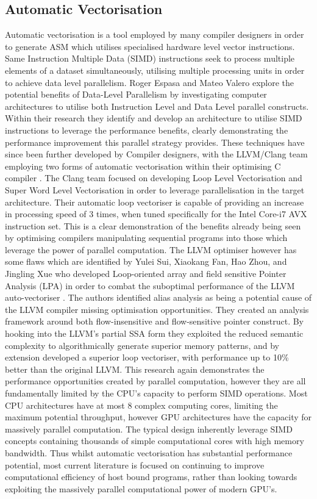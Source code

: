 \subsection{Automatic Vectorisation}
Automatic vectorisation is a tool employed by many compiler designers in order to generate ASM which
utilises specialised hardware level vector instructions.  Same Instruction Multiple Data (SIMD)
instructions seek to process multiple elements of a dataset simultaneously, utilising multiple
processing units in order to achieve data level parallelism. Roger Espasa and Mateo Valero
\cite{espasa1997exploiting} explore the potential benefits of Data-Level Parallelism by
investigating computer architectures to utilise both Instruction Level and Data Level parallel
constructs. Within their research they identify and develop an architecture to utilise SIMD
instructions to leverage the performance benefits, clearly demonstrating the performance improvement
this parallel strategy provides. These techniques have since been further developed by Compiler
designers, with the LLVM/Clang team employing two forms of automatic vectorisation within their
optimising C compiler \cite{website:llvmAutoVectorize}. The Clang team focused on developing Loop
Level Vectorisation and Super Word Level Vectorisation in order to leverage parallelisation in the
target architecture.  Their automatic loop vectoriser is capable of providing an increase in
processing speed of 3 times, when tuned specifically for the Intel Core-i7 AVX instruction set. This
is a clear demonstration of the benefits already being seen by optimising compilers manipulating
sequential programs into those which leverage the power of parallel computation. The LLVM optimiser
however has some flaws which are identified by Yulei Sui, Xiaokang Fan, Hao Zhou, and Jingling Xue
who developed Loop-oriented array and field sensitive Pointer Analysis (LPA) in order to combat the
suboptimal performance of the LLVM auto-vectoriser \cite{sui2016loop}. The authors identified alias
analysis as being a potential cause of the LLVM compiler missing optimisation opportunities. They
created an analysis framework around both flow-insensitive and flow-sensitive pointer construct. By
hooking into the LLVM’s partial SSA form they exploited the reduced semantic complexity to
algorithmically generate superior memory patterns, and by extension developed a superior loop
vectoriser, with performance up to 10\% better than the original LLVM. This research again
demonstrates the performance opportunities created by parallel computation, however they are all
fundamentally limited by the CPU’s capacity to perform SIMD operations. Most CPU architectures have
at most 8 complex computing cores, limiting the maximum potential throughput, however GPU
architectures have the capacity for massively parallel computation. The typical design inherently
leverage SIMD concepts containing thousands of simple computational cores with high memory
bandwidth. Thus whilst automatic vectorisation has substantial performance potential, most current
literature is focused on continuing to improve computational efficiency of host bound programs,
rather than looking towards exploiting the massively parallel computational power of modern GPU’s.

